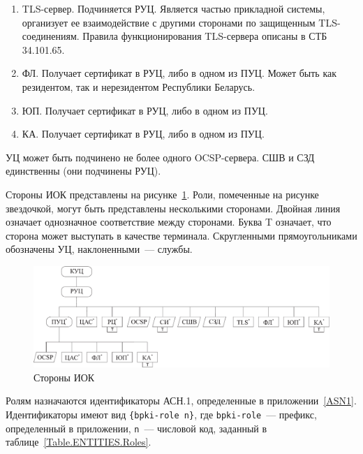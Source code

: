 \begin{enumerate}
\item
TLS-сервер. Подчиняется РУЦ.
Является частью прикладной системы, организует ее взаимодействие 
с другими сторонами по защищенным TLS-соединениям. 
Правила функционирования TLS-сервера описаны в СТБ 34.101.65.

\item
ФЛ. Получает сертификат в РУЦ, либо в одном из ПУЦ.
Может быть как резидентом, так и нерезидентом Республики Беларусь.

\item
ЮП. Получает сертификат в РУЦ, либо в одном из ПУЦ.

\item
КА. Получает сертификат в РУЦ, либо в одном из ПУЦ.
%
\end{enumerate}

УЦ может быть подчинено не более одного OCSP-сервера.
СШВ и СЗД единственны (они подчинены РУЦ). 

Стороны ИОК представлены на рисунке~\ref{Fig.ENTITIES.1}.
Роли, помеченные на рисунке звездочкой, могут быть представлены 
несколькими сторонами. Двойная линия означает однозначное соответствие 
между сторонами. Буква T означает, что сторона может выступать в качестве 
терминала. Скругленными прямоугольниками обозначены УЦ, наклоненными~--- службы.

\begin{figure}[bht]
\begin{center}
\includegraphics[width=17cm]{../figs/entities}
\end{center}
\caption{Стороны ИОК}
\label{Fig.ENTITIES.1}
\end{figure}

Ролям назначаются идентификаторы АСН.1, определенные в приложении~\ref{ASN1}. 
Идентификаторы имеют вид \verb|{bpki-role n}|,
где \verb|bpki-role|~--- префикс, определенный в приложении,
\texttt{n}~--- числовой код, заданный в таблице~\ref{Table.ENTITIES.Roles}.

